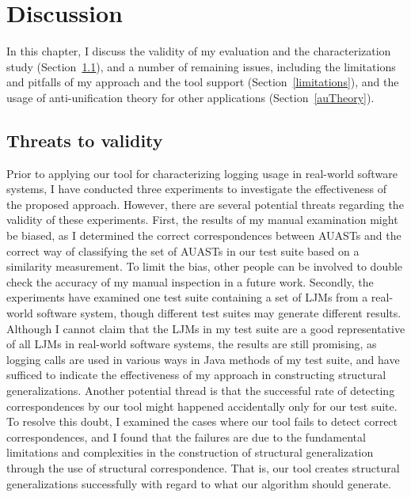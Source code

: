 \chapter{Discussion}  \label{diss}

In this chapter, I discuss the validity of my evaluation and the characterization study (Section~\ref{threads}), and a number of remaining issues, including the limitations and pitfalls of my approach and the tool support (Section~\ref{limitations}), and the usage of anti-unification theory for other applications (Section~\ref{auTheory}).

\section{Threats to validity}  \label{threads}
Prior to applying our tool for characterizing logging usage in real-world software systems, I have conducted three experiments to investigate the effectiveness of the proposed approach. However, there are several potential threats regarding the validity of these experiments. First, the results of my manual examination might be biased, as I determined the correct correspondences between AUASTs and the correct way of classifying the set of AUASTs in our test suite based on a similarity measurement. To limit the bias, other people can be involved to double check the accuracy of my manual inspection in a future work. Secondly, the experiments have examined one test suite containing a set of LJMs from a real-world software system, though different test suites may generate different results. Although I cannot claim that the LJMs in my test suite are a good representative of all LJMs in real-world software systems, the results are still promising, as logging calls are used in various ways in Java methods of my test suite, and have sufficed to indicate the effectiveness of my approach in constructing structural generalizations. Another potential thread is that the successful rate of detecting correspondences by our tool might happened accidentally only for our test suite. To resolve this doubt, I examined the cases where our tool fails to detect correct correspondences, and I found that the failures are due to the fundamental limitations and complexities in the construction of structural generalization through the use of structural correspondence. That is, our tool creates structural generalizations successfully with regard to what our algorithm should generate.
